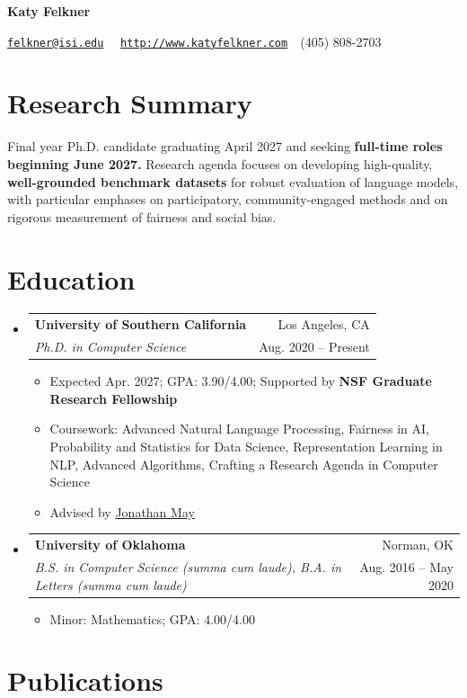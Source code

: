 \documentclass[letterpaper,11pt]{article}
\makeatletter
\newcommand{\resumeItem}[1]{
  \item\small{
  {#1 \vspace{-2pt}}
  }
}
\newcommand{\resumeSubheading}[4]{
  \vspace{-1pt} \item
    \begin{tabular*}{0.97\textwidth}{l@{\extracolsep{\fill}}r}
      \textbf{#1} & #2 \\
      \textit{\small#3} & \small #4 \\
      
    \end{tabular*}\vspace{-5pt}
}
\newcommand{\resumeSubHeadingListStart}{\begin{itemize}[label={}, leftmargin=*]}
\newcommand{\resumeSubHeadingListEnd}{\end{itemize}}
\newcommand{\resumeItemListStart}{\begin{itemize}}
\newcommand{\resumeItemListEnd}{\end{itemize}\vspace{-5pt}}
\makeatother
\begin{document}
\textbf{\LARGE Katy Felkner}

\href{mailto:felkner@isi.edu}{\texttt{felkner@isi.edu}}~\textbar~ \href{http://katyfelkner.com/}{\texttt{http://www.katyfelkner.com}}~\textbar~(405) 808-2703

\section{Research Summary}
\small{Final year Ph.D. candidate graduating April 2027 and seeking \textbf{full-time roles beginning June 2027.} Research agenda focuses on developing high-quality, \textbf{well-grounded benchmark datasets} for robust evaluation of language models, with particular emphases on participatory, community-engaged methods and on rigorous measurement of fairness and social bias.}

\section{Education}
  \resumeSubHeadingListStart
    \resumeSubheading
      {University of Southern California}{Los Angeles, CA}
      {Ph.D. in Computer Science}{Aug. 2020 -- Present}
      \resumeItemListStart
        \resumeItem{Expected Apr. 2027; GPA: 3.90/4.00; Supported by \textbf{NSF Graduate Research Fellowship}}
      \resumeItem{Coursework: Advanced Natural Language Processing, Fairness in AI, Probability and Statistics for Data Science, Representation Learning in NLP, Advanced Algorithms, Crafting a Research Agenda in Computer Science}
      \resumeItem{Advised by \href{https://jonmay.github.io/webpage/}{Jonathan May}}
      \resumeItemListEnd
    \resumeSubheading
      {University of Oklahoma}{Norman, OK}
      {B.S. in Computer Science \textit{(summa cum laude)}, B.A. in Letters \textit{(summa cum laude)}}{Aug. 2016 -- May 2020}
      \resumeItemListStart
        \resumeItem{Minor: Mathematics; GPA: 4.00/4.00} 
      \resumeItemListEnd
  \resumeSubHeadingListEnd

\section{Publications}
\begin{refsection}
\nocite{*}
\printbibliography[heading=none]
\end{refsection}
\end{document}
